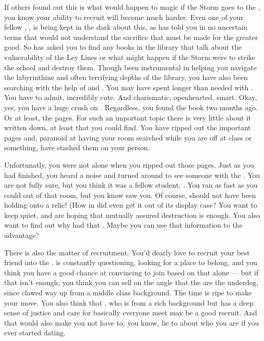 \documentclass[char]{GL2020}
\begin{document}
If others found out this is what would happen to magic if the Storm goes to the \pSchoo{}, you know your ability to recruit will become much harder. Even one of your fellow \pGoaties{}, \cChupInventor{\full}, is being kept in the dark about this, as \cChupSecond{} has told you in no uncertain terms that \cChupInventor{\they} would not understand the sacrifice that must be made for the greater good. So \cChupSecond{} has asked you to find any books in the library that talk about the vulnerability of the Ley Lines or what might happen if the Storm were to strike the school and destroy them. Though \cChupSecond{\they} \cChupSecond{\have} been instrumental in helping you navigate the labyrinthine and often terrifying depths of the library, you have also been searching with the help of \cAmbition{} and \cPresident{}. You may have spent longer than needed with \cPresident{}. You have to admit, \cPresident{\they} \cPresident{\are} incredibly cute. And charismatic, openhearted, smart. Okay, yes, you have a huge crush on \cPresident{\them}. Regardless, you found the book two months ago. Or at least, the pages. For such an important topic there is very little about it written down, at least that you could find. You have ripped out the important pages and, paranoid at having your room searched while you are off at class or something, have stashed them on your person.  

Unfortunatly, you were not alone when you ripped out those pages. Just as you had finished, you heard a noise and turned around to see someone with the \iScythe{}.  You are not fully sure, but you think it was a fellow student, \cScholarship{\full}. You ran as fast as you could out of that room, but you know \cScholarship{\they} saw you.  Of course, \cScholarship{} should not have been holding onto a relic! (How in \pEarth{} did \cScholarship{\they} even get it out of its display case? You want to keep \cScholarship{\them} quiet, and are hoping that mutually assured destruction is enough. You also want to find out why \cScholarship{\they} had that \scythe{}.  Maybe you can use that information to the \pGoaties{} advantage? 
 
There is also the matter of recruitment. You'd dearly love to recruit your best friend \cAmbition{} into the \pGoaties{}. \cAmbition{} is constantly questioning, looking for a place to belong, and you think you have a good chance at convincing \cAmbition{\them} to join based on that alone — but if that isn't enough, you think you can sell \cAmbition{\them} on the angle that the \pGoaties{} are the underdog, since \cAmbition{} clawed \cAmbition{\their} way up from a middle class background. The time is ripe to make your move. You also think that \cPresident{}, who is from a rich background but has a deep sense of justice and care for basically everyone \cPresident{\they} meet may be a good recruit.  And that would also make you not have to, you know, lie to \cPresident{} about who you are if you ever started dating.
\end{document}
